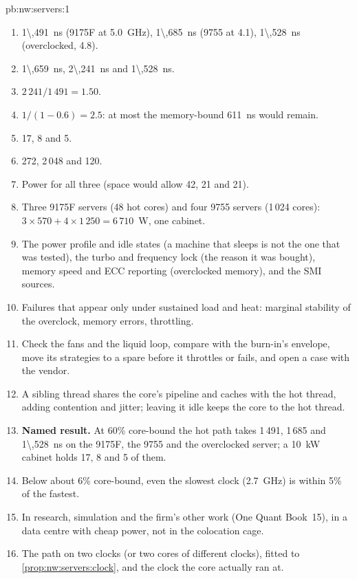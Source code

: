 \begin{solution}{pb:nw:servers:1}
\begin{enumerate}
\item \qty{1\,491}{\nano\second} (9175F at 5.0~GHz), \qty{1\,685}{\nano\second} (9755 at 4.1), \qty{1\,528}{\nano\second} (overclocked, 4.8).
\item \qty{1\,659}{\nano\second}, \qty{2\,241}{\nano\second} and \qty{1\,528}{\nano\second}.
\item $2\,241 / 1\,491 = 1.50$.
\item $1/(1 - 0.6) = 2.5$: at most the memory-bound \qty{611}{\nano\second} would remain.
\item 17, 8 and 5.
\item 272, 2\,048 and 120.
\item Power for all three (space would allow 42, 21 and 21).
\item Three 9175F servers (48 hot cores) and four 9755 servers (1\,024 cores): $3 \times 570 + 4 \times 1\,250 = 6\,710$~W, one cabinet.
\item The power profile and idle states (a machine that sleeps is not the one that was tested), the turbo and frequency lock (the reason it was
  bought), memory speed and ECC reporting (overclocked memory), and the SMI sources.
\item Failures that appear only under sustained load and heat: marginal stability of the overclock, memory errors, throttling.
\item Check the fans and the liquid loop, compare with the burn-in's envelope, move its strategies to a spare before it throttles or fails,
  and open a case with the vendor.
\item A sibling thread shares the core's pipeline and caches with the hot thread, adding contention and jitter; leaving it idle keeps the core
  to the hot thread.
\item \textbf{Named result.} At 60\% core-bound the hot path takes 1\,491, 1\,685 and \qty{1\,528}{\nano\second} on the 9175F, the 9755 and the
  overclocked server; a \qty{10}{\kilo\watt} cabinet holds 17, 8 and 5 of them.
\item Below about 6\% core-bound, even the slowest clock (2.7~GHz) is within 5\% of the fastest.
\item In research, simulation and the firm's other work (One Quant Book~15), in a data centre with cheap power, not in the colocation cage.
\item The path on two clocks (or two cores of different clocks), fitted to \cref{prop:nw:servers:clock}, and the clock the core actually ran at.

\end{enumerate}
\end{solution}

